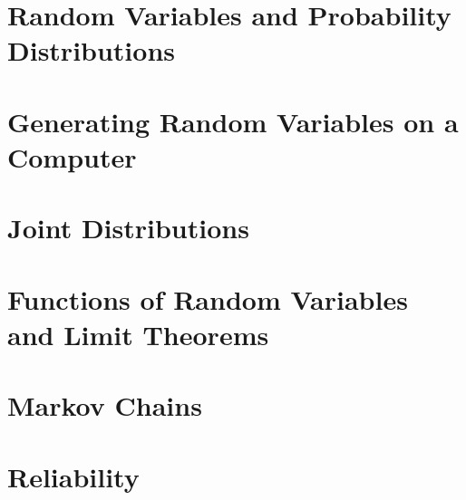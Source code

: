 
\chapter{Random Variables and Probability Distributions}


\chapter{Generating Random Variables on a Computer}


\chapter{Joint Distributions}


\chapter{Functions of Random Variables and Limit Theorems}


\chapter{Markov Chains}


\chapter{Reliability}\label{reliability}



